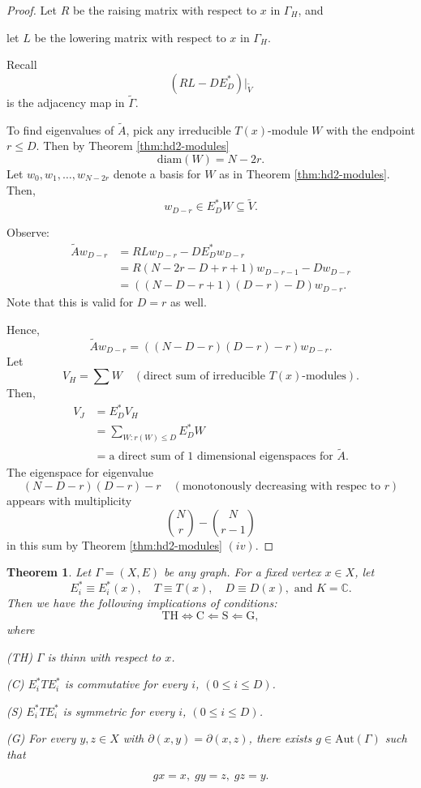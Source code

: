 \documentclass[
]{book}
\newtheorem{theorem}{Theorem}[chapter]
\theoremstyle{definition}
\theoremstyle{definition}
\theoremstyle{definition}
\theoremstyle{definition}
\theoremstyle{remark}
\begin{document}
\begin{proof}
Let \(R\) be the raising matrix with respect to \(x\) in \(\Gamma_H\), and

let \(L\) be the lowering matrix with respect to \(x\) in \(\Gamma_H\).

Recall
\[(RL - DE^*_D) |_{\tilde{V}}\]
is the adjacency map in \(\tilde{\Gamma}\).

To find eigenvalues of \(\tilde{A}\), pick any irreducible \(T(x)\)-module \(W\) with the endpoint \(r\leq D\). Then by Theorem \ref{thm:hd2-modules}
\[\text{diam}(W) = N-2r.\]
Let \(w_0, w_1, \ldots, w_{N-2r}\) denote a basis for \(W\) as in Theorem \ref{thm:hd2-modules}. Then,
\[w_{D-r} \in E^*_DW \subseteq \tilde{V}.\]

Observe:
\begin{align}
\tilde{A}w_{D-r} & = RLw_{D-r} - DE_D^*w_{D-r}\\
& = R(N-2r-D+r+1)w_{D-r-1} - Dw_{D-r}\\
& = ((N-D-r+1)(D-r) - D)w_{D-r}.
\end{align}
Note that this is valid for \(D = r\) as well.

Hence,
\[\tilde{A}w_{D-r}  = ((N-D-r)(D-r)-r)w_{D-r}.\]
Let
\[V_H = \sum W \quad (\text{direct sum of irreducible }T(x)\text{-modules}).\]
Then,
\begin{align}
V_J & = E_D^*V_H\\
& = \sum_{W:r(W)\leq D} E_D^*W\\
& = \text{a direct sum of 1 dimensional eigenspaces for }\tilde{A}.
\end{align}
The eigenspace for eigenvalue
\[(N-D-r)(D-r)-r \quad (\text{monotonously decreasing with respec to }r)\]
appears with multiplicity
\[\binom{N}{r} - \binom{N}{r-1}\]
in this sum by Theorem \ref{thm:hd2-modules} \((iv)\).
\end{proof}

\begin{theorem}
\protect\hypertarget{thm:thin-condition}{}\label{thm:thin-condition}Let \(\Gamma = (X, E)\) be any graph. For a fixed vertex \(x\in X\), let
\[E_i^*\equiv E_i^*(x), \quad T\equiv T(x), \quad D \equiv D(x), \text{ and } K = \mathbb{C}.\]
Then we have the following implications of conditions:
\[\text{TH} \Leftrightarrow \text{C} \Leftarrow \text{S} \Leftarrow \text{G},\]
where

(TH) \(\Gamma\) is thinn with respect to \(x\).

(C) \(E^*_iTE^*_i\) is commutative for every \(i\), \((0\leq i \leq D)\).

(S) \(E^*_iTE^*_i\) is symmetric for every \(i\), \((0\leq i \leq D)\).

(G) For every \(y, z\in X\) with \(\partial(x,y) = \partial(x,z)\), there exists \(g\in \mathrm{Aut}(\Gamma)\) such that

\[gx = x, \; gy = z, \; gz = y.\]
\end{theorem}
\end{document}
